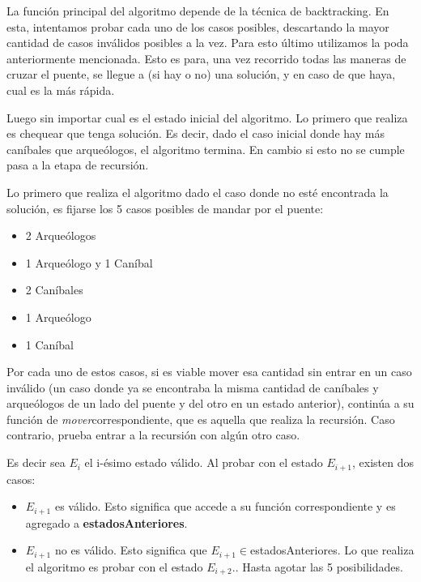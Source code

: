       La función principal del algoritmo depende de la técnica de backtracking. En esta, intentamos probar cada uno de los casos posibles, descartando la mayor cantidad de casos inválidos posibles a la vez. Para esto último utilizamos la poda anteriormente mencionada. Esto es para, una vez recorrido todas las maneras de cruzar el puente, se llegue a (si hay o no) una solución, y en caso de que haya, cual es la más rápida.

      Luego sin importar cual es el estado inicial del algoritmo. Lo primero que realiza es chequear que tenga solución. Es decir, dado el caso inicial donde hay más caníbales que arqueólogos, el algoritmo termina. En cambio si esto no se cumple pasa a la etapa de recursión. 

      Lo primero que realiza el algoritmo dado el caso donde no esté encontrada la solución, es fijarse los 5 casos posibles de mandar por el puente:

      \begin{itemize}
      	\item 2 Arqueólogos
      	\item 1 Arqueólogo y 1 Caníbal
      	\item 2 Caníbales
      	\item 1 Arqueólogo
      	\item 1 Caníbal
      \end{itemize}

       Por cada uno de estos casos, si es viable mover esa cantidad sin entrar en un caso inválido (un caso donde ya se encontraba la misma cantidad de caníbales y arqueólogos de un lado del puente y del otro en un estado anterior), continúa a su función de \emph{mover}correspondiente, que es aquella que realiza la recursión. Caso contrario, prueba entrar a la recursión con algún otro caso. 

       Es decir sea $E_{i}$ el i-ésimo estado válido. Al probar con el estado $E_{i+1}$, existen dos casos:

       \begin{itemize}
       	\item $E_{i+1}$ es válido. Esto significa que accede a su función correspondiente y es agregado a \textbf{estadosAnteriores}.
       	\item $E_{i+1}$ no es válido. Esto significa que  $E_{i+1} \in$estadosAnteriores. Lo que realiza el algoritmo es probar con el estado $E_{i+2}$.. Hasta agotar las 5 posibilidades.
       \end{itemize}

